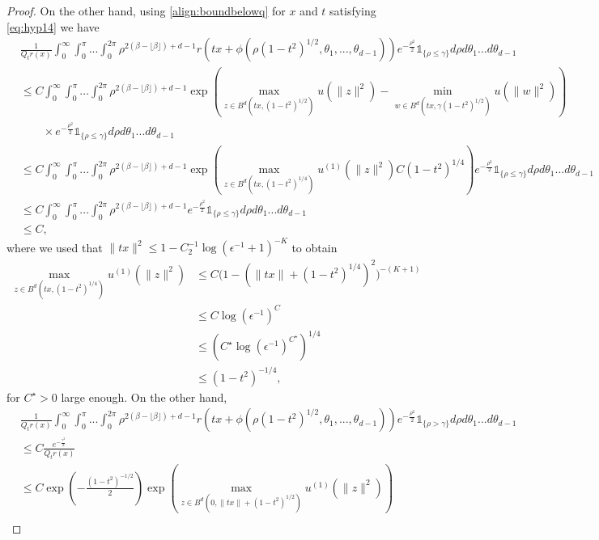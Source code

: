 \documentclass{article}
\begin{document}
\begin{proof}
On the other hand, 
using \eqref{align:boundbelowq} for $x$ and $t$ satisfying \eqref{eq:hyp14} we have 
\begin{align*}
  &\frac{1}{Q_tr(x)} \int_0^{\infty}\int_0^\pi... \int_0^{2\pi} \rho^{2(\beta-\lfloor \beta \rfloor) +d-1 }r(tx +\phi(\rho(1-t^2)^{1/2},\theta_1,...,\theta_{d-1}))e^{-\frac{\rho^2}{2}}\mathds{1}_{\{\rho\leq \gamma\}}d\rho d\theta_1...d\theta_{d-1}  \\
  &\leq C\int_0^{\infty}\int_0^\pi... \int_0^{2\pi} \rho^{2(\beta-\lfloor \beta \rfloor) +d-1 }\exp\left(\max_{z\in B^d(tx,(1-t^2)^{1/2})}u(\|z\|^2)-\min_{w\in B^d(tx,\gamma(1-t^2)^{1/2})}u(\|w\|^2)\right)\\
  &\quad \quad \times e^{-\frac{\rho^2}{2}}\mathds{1}_{\{\rho\leq \gamma\}}d\rho d\theta_1...d\theta_{d-1}
  \\
  &\leq C\int_0^{\infty}\int_0^\pi... \int_0^{2\pi} \rho^{2(\beta-\lfloor \beta \rfloor) +d-1 }\exp\left(\max_{z\in B^d(tx,(1-t^2)^{1/4})}u^{(1)}(\|z\|^2)C(1-t^2)^{1/4}\right)e^{-\frac{\rho^2}{2}}\mathds{1}_{\{\rho\leq \gamma\}}d\rho d\theta_1...d\theta_{d-1}
  \\
  &\leq C\int_0^{\infty}\int_0^\pi... \int_0^{2\pi} \rho^{2(\beta-\lfloor \beta \rfloor) +d-1 }e^{-\frac{\rho^2}{2}}\mathds{1}_{\{\rho\leq \gamma\}}d\rho d\theta_1...d\theta_{d-1}\\
  &\leq C,
\end{align*}
where we used that $\|tx\|^2\leq 1-C_2^{-1}\log(\epsilon^{-1}+1)^{-K}$ to obtain
\begin{align*}
\max_{z\in B^d(tx,(1-t^2)^{1/4})}u^{(1)}(\|z\|^2)&\leq C\Big(1-(\|tx\|+(1-t^2)^{1/4})^2\Big)^{-(K+1)}\\
& \leq C\log(\epsilon^{-1})^C\\
& \leq \left(C^\star \log(\epsilon^{-1})^{C^\star}\right)^{1/4}\\
&\leq (1-t^2)^{-1/4},
\end{align*}
for $C^\star>0$ large enough.
On the other hand,
\begin{align*}
    &\frac{1}{Q_tr(x)} \int_0^{\infty}\int_0^\pi... \int_0^{2\pi} \rho^{2(\beta-\lfloor \beta \rfloor) +d-1 }r(tx +\phi(\rho(1-t^2)^{1/2},\theta_1,...,\theta_{d-1}))e^{-\frac{\rho^2}{2}}\mathds{1}_{\{\rho> \gamma\}}d\rho d\theta_1...d\theta_{d-1}\\
    &\leq C\frac{e^{-\frac{\gamma^2}{2}}}{Q_tr(x)}\\
    & \leq C\exp\left(-\frac{(1-t^2)^{-1/2}}{2}\right)\exp\left(\max_{z\in B^d(0,\|tx\|+(1-t^2)^{1/2})}u^{(1)}(\|z\|^2)\right)\\

\end{align*}
\end{proof}
\end{document}
